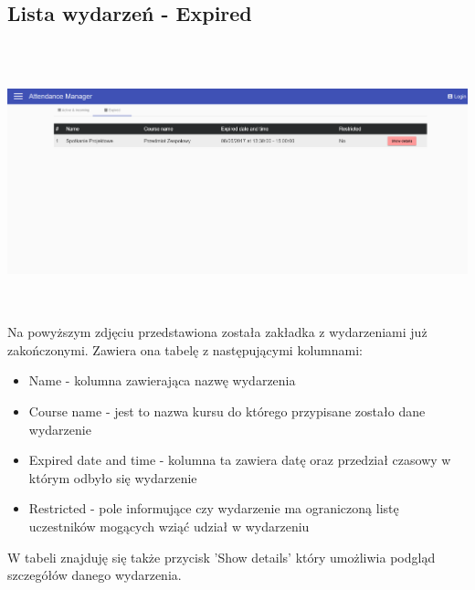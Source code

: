 \subsection{Lista wydarzeń - Expired}
\includegraphics[height=8cm,width=15cm]{images/EventsListExpired}
Na powyższym zdjęciu przedstawiona została zakładka z wydarzeniami już zakończonymi. Zawiera ona tabelę z następującymi kolumnami:
\begin{itemize}
    \item Name - kolumna zawierająca nazwę wydarzenia
    \item Course name - jest to nazwa kursu do którego przypisane zostało dane wydarzenie
    \item Expired date and time - kolumna ta zawiera datę oraz przedział czasowy w którym odbyło się wydarzenie
    \item Restricted - pole informujące czy wydarzenie ma ograniczoną listę uczestników mogących wziąć udział w wydarzeniu
\end{itemize}
W tabeli znajduję się także przycisk 'Show details' który umożliwia podgląd szczegółów danego wydarzenia.

